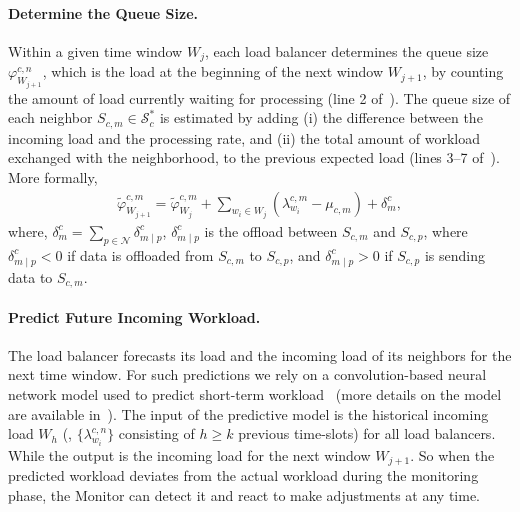 \paragraph{Determine the Queue Size.} Within a given time window $W_{j}$, each load balancer determines the queue size $\varphi^{c,n}_{W_{j+1}}$, which is the load at the beginning of the next window $W_{j+1}$, by counting the amount of load currently waiting for processing (line 2 of~). The queue size of each neighbor $S_{c,m} \in \mathcal{S}_c^*$ is estimated
by adding (i) the difference between the incoming load and the processing rate, and (ii) the total amount of workload exchanged with the neighborhood, to the previous expected load (lines 3--7 of~). More formally,
\begin{equation}
    \begin{split}
        \tilde{\varphi}^{c,m}_{W_{j+1}} = \tilde{\varphi}^{c,m}_{W_{j}} + \sum_{w_i \in W_{j}}(\lambda^{c,m}_{w_i} - \mu_{c,m}) + \delta^c_{m}, %
    \end{split}
    \label{eqn:queue_size_estimation}
\end{equation}
where, $\delta^c_{m} = \sum_{p \in \mathcal{N}} \delta^c_{m \mid p}$, $\delta^c_{m \mid p}$ is the offload between $S_{c,m}$ and $S_{c,p}$, where $\delta^c_{m \mid p} < 0$ if data is offloaded from $S_{c,m}$ to $S_{c,p}$, and $\delta^c_{m \mid p} > 0$ if $S_{c,p}$ is sending data to $S_{c,m}$.

\paragraph{Predict Future Incoming Workload.} The load balancer forecasts its load and the incoming load of its neighbors for the next time window. For such predictions we rely on a convolution-based neural network model used to predict short-term workload~\cite{kombi2017preventive} (more details on the model are available in~). The input of the predictive model is the historical incoming load $W_h$ (\ie, $\{\lambda^{c,n}_{w_i}\}$ consisting of $h \ge k$ previous time-slots) for all load balancers. While the output is the incoming load for the next window $W_{j+1}$. So when the predicted workload deviates from the actual workload during the monitoring phase, the Monitor can detect it and react to make adjustments at any time.

